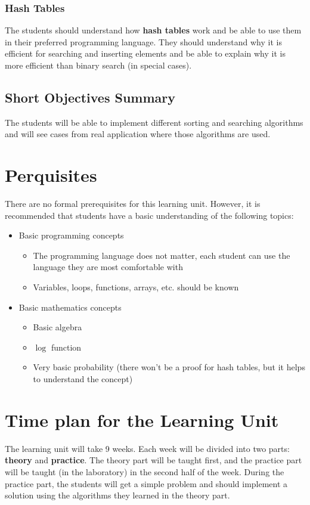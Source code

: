 \documentclass[10pt, oneside]{article}
\theoremstyle{remark}
\begin{document}
\subsubsection{Hash Tables}
The students should understand how \textbf{hash tables} work and be able to use them in their preferred programming language. They should understand why it is efficient for searching and inserting elements and be able to explain why it is more efficient than binary search (in special cases).

\subsection{Short Objectives Summary}
The students will be able to implement different sorting and searching algorithms and will see cases from real application where those algorithms are used.

\section{Perquisites}
There are no formal prerequisites for this learning unit. However, it is recommended that students have a basic understanding of the following topics:
\begin{itemize}
  \item Basic programming concepts
  \begin{itemize}
    \item The programming language does not matter, each student can use the language they are most comfortable with
    \item Variables, loops, functions, arrays, etc. should be known
  \end{itemize}
  \item Basic mathematics concepts
  \begin{itemize}
    \item Basic algebra
    \item $\log$ function
    \item Very basic probability (there won't be a proof for hash tables, but it helps to understand the concept)
  \end{itemize}
\end{itemize}

\section{Time plan for the Learning Unit}
The learning unit will take 9 weeks. Each week will be divided into two parts: \textbf{theory} and \textbf{practice}. The theory part will be taught first, and the practice part will be taught (in the laboratory) in the second half of the week. During the practice part, the students will get a simple problem and should implement a solution using the algorithms they learned in the theory part.
\end{document}
